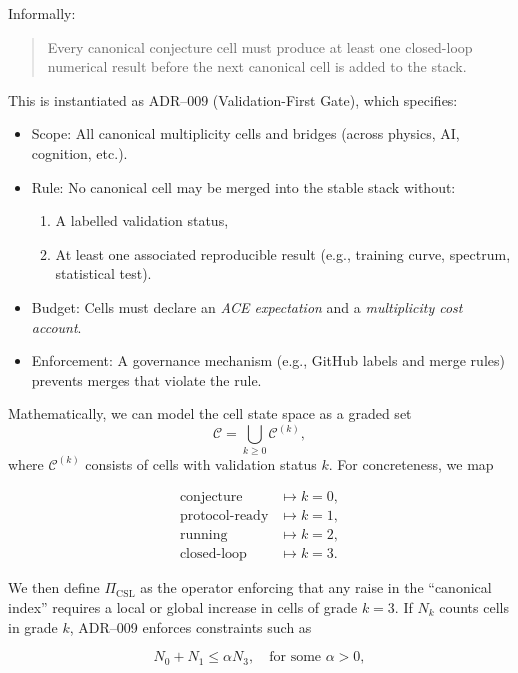 \documentclass[11pt]{article}
\begin{document}
Informally:

\begin{quote}
Every canonical conjecture cell must produce at least one closed-loop numerical result before the next canonical cell is added to the stack.
\end{quote}

This is instantiated as ADR--009 (Validation-First Gate), which specifies:

\begin{itemize}[leftmargin=*]
  \item Scope: All canonical multiplicity cells and bridges (across physics, AI, cognition, etc.).
  \item Rule: No canonical cell may be merged into the stable stack without:
    \begin{enumerate}
      \item A labelled validation status,
      \item At least one associated reproducible result (e.g., training curve, spectrum, statistical test).
    \end{enumerate}
  \item Budget: Cells must declare an \emph{ACE expectation} and a \emph{multiplicity cost account}.
  \item Enforcement: A governance mechanism (e.g., GitHub labels and merge rules) prevents merges that violate the rule.
\end{itemize}

Mathematically, we can model the cell state space as a graded set
\[
\mathcal{C} = \bigcup_{k \ge 0} \mathcal{C}^{(k)},
\]
where \(\mathcal{C}^{(k)}\) consists of cells with validation status \(k\). For concreteness, we map

\[
\begin{aligned}
\text{conjecture} &\mapsto k=0,\\
\text{protocol-ready} &\mapsto k=1,\\
\text{running} &\mapsto k=2,\\
\text{closed-loop} &\mapsto k=3.
\end{aligned}
\]

We then define \(\Pi_{\mathrm{CSL}}\) as the operator enforcing that any raise in the ``canonical index'' requires a local or global increase in cells of grade \(k=3\). If \(N_k\) counts cells in grade \(k\), ADR--009 enforces constraints such as

\[
N_0 + N_1 \le \alpha N_3, \quad \text{for some } \alpha > 0,
\]
\end{document}
